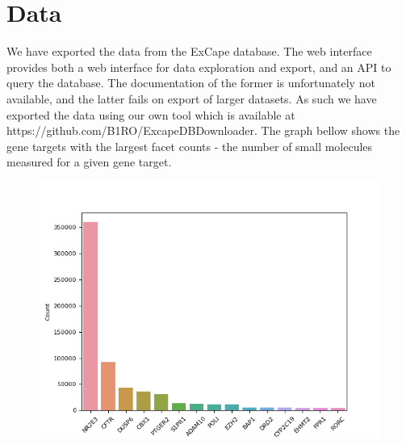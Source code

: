 \documentclass[11pt]{article}
\begin{document}
    
    


    \section{Data}
    We have exported the data from the ExCape database.
    The web interface provides both a web interface for data exploration and export, and an API to query the database.
    The documentation of the former is unfortunately not available, and the latter fails on export of larger datasets.
    As such we have exported the data using our own tool which is available at https://github.com/B1RO/ExcapeDBDownloader.
    The graph bellow shows the gene targets with the largest facet counts - the number of small molecules measured for a given gene target.
    \begin{figure}[h!]
        \includegraphics{target_counts}
        \label{fig:target_counts}
    \end{figure}
\end{document}
